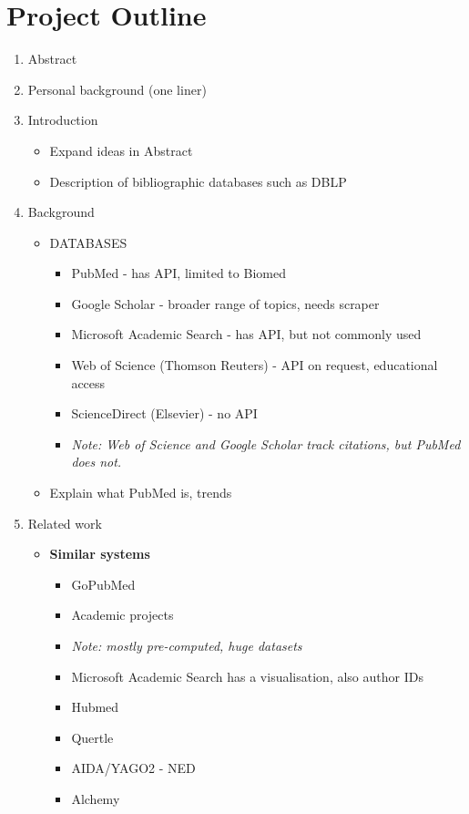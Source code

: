 \documentclass[a4paper,12pt]{article}
\begin{document}
\section{Project Outline}
\begin{enumerate}
	\item Abstract
	\item Personal background (one liner)
	\item Introduction
	\begin{itemize}
		\item Expand ideas in Abstract
		\item Description of bibliographic databases such as DBLP
	\end{itemize}
	\item Background
	\begin{itemize}
		\item DATABASES
			\begin{itemize}
			\item PubMed - has API, limited to Biomed
			\item Google Scholar - broader range of topics, needs scraper
			\item Microsoft Academic Search - has API, but not commonly used			
			\item Web of Science (Thomson Reuters) - API on request, educational access
			\item ScienceDirect (Elsevier) - no API
			\item \emph{Note: Web of Science and Google Scholar track citations, but PubMed does not.}
		\end{itemize}
		\item Explain what PubMed is, trends
	\end{itemize}		
	\item Related work
	\begin{itemize}
		\item \textbf{Similar systems}
		\begin{itemize}
			\item GoPubMed
			\item Academic projects 
			\item \emph{Note: mostly pre-computed, huge datasets}
			\item Microsoft Academic Search has a visualisation, also author IDs
			\item Hubmed
			\item Quertle
			\item AIDA/YAGO2 - NED
			\item Alchemy

\end{itemize}
\end{itemize}
\end{enumerate}
\end{document}
